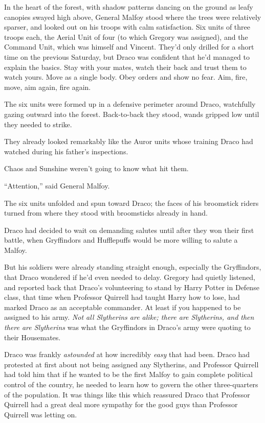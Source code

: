In the heart of the forest, with shadow patterns dancing on the ground
as leafy canopies swayed high above, General Malfoy stood where the
trees were relatively sparser, and looked out on his troops with calm
satisfaction. Six units of three troops each, the Aerial Unit of four
(to which Gregory was assigned), and the Command Unit, which was himself
and Vincent. They'd only drilled for a short time on the previous
Saturday, but Draco was confident that he'd managed to explain the
basics. Stay with your mates, watch their back and trust them to watch
yours. Move as a single body. Obey orders and show no fear. Aim, fire,
move, aim again, fire again.

The six units were formed up in a defensive perimeter around Draco,
watchfully gazing outward into the forest. Back-to-back they stood,
wands gripped low until they needed to strike.

They already looked remarkably like the Auror units whose training Draco
had watched during his father's inspections.

Chaos and Sunshine weren't going to know what hit them.

``Attention,'' said General Malfoy.

The six units unfolded and spun toward Draco; the faces of his
broomstick riders turned from where they stood with broomsticks already
in hand.

Draco had decided to wait on demanding salutes until after they won
their first battle, when Gryffindors and Hufflepuffs would be more
willing to salute a Malfoy.

But his soldiers were already standing straight enough, especially the
Gryffindors, that Draco wondered if he'd even needed to delay. Gregory
had quietly listened, and reported back that Draco's volunteering to
stand by Harry Potter in Defense class, that time when Professor
Quirrell had taught Harry how to lose, had marked Draco as an acceptable
commander. At least if you happened to be assigned to his army.
\emph{Not all Slytherins are alike; there are Slytherins, and then there
are Slytherins} was what the Gryffindors in Draco's army were quoting to
their Housemates.

Draco was frankly \emph{astounded} at how incredibly \emph{easy} that
had been. Draco had protested at first about not being assigned any
Slytherins, and Professor Quirrell had told him that if he wanted to be
the first Malfoy to gain complete political control of the country, he
needed to learn how to govern the other three-quarters of the
population. It was things like this which reassured Draco that Professor
Quirrell had a great deal more sympathy for the good guys than Professor
Quirrell was letting on.

